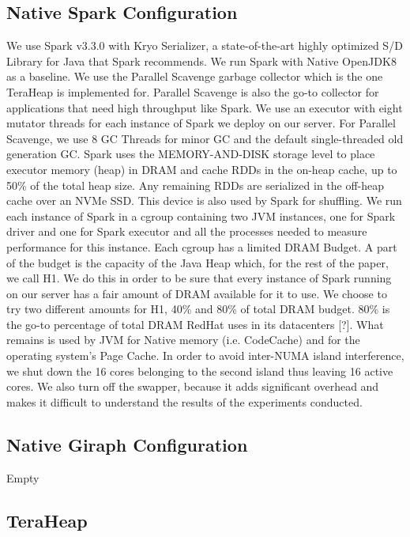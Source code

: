\subsection{Native Spark Configuration}
We use Spark v3.3.0 with Kryo Serializer, a state-of-the-art highly
optimized S/D Library for Java that Spark recommends. We run Spark
with Native OpenJDK8 as a baseline. We use the Parallel Scavenge
garbage collector which is the one TeraHeap is implemented for.
Parallel Scavenge is also the go-to collector for applications that
need high throughput like Spark. We use an executor with eight mutator
threads for each instance of Spark we deploy on our server. For
Parallel Scavenge, we use 8 GC Threads for minor GC and the default
single-threaded old generation GC. Spark uses the MEMORY-AND-DISK
storage level to place executor memory (heap) in DRAM and cache RDDs
in the on-heap cache, up to 50\% of the total heap size. Any remaining
RDDs are serialized in the off-heap cache over an NVMe SSD. This
device is also used by Spark for shuffling. We run each instance of
Spark in a cgroup containing two JVM instances, one for Spark driver
and one for Spark executor and all the processes needed to measure
performance for this instance. Each cgroup has a limited DRAM Budget.
A part of the budget is the capacity of the Java Heap which, for the
rest of the paper, we call H1. We do this in order to be sure that
every instance of Spark running on our server has a fair amount of
DRAM available for it to use. We choose to try two different amounts
for H1, 40\% and 80\% of total DRAM budget. 80\% is the go-to
percentage of total DRAM RedHat uses in its datacenters [?]. What
remains is used by JVM for Native memory (i.e. CodeCache) and for the
operating system's Page Cache. In order to avoid inter-NUMA island
interference, we shut down the 16 cores belonging to the second island
thus leaving 16 active cores. We also turn off the swapper, because it
adds significant overhead and makes it difficult to understand the
results of the experiments conducted.

\subsection{Native Giraph Configuration}
Empty

\subsection{TeraHeap}
